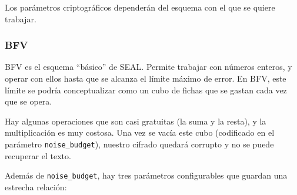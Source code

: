 Los parámetros criptográficos dependerán del esquema con el que se quiere trabajar.

\subsubsection{BFV}

BFV es el esquema ``básico'' de SEAL. Permite trabajar con números enteros, y operar con ellos hasta que se alcanza el límite máximo de error. En BFV, este límite se podría conceptualizar como un cubo de fichas que se gastan cada vez que se opera.

Hay algunas operaciones que son casi gratuitas (la suma y la resta), y la multiplicación es muy costosa. Una vez se vacía este cubo (codificado en el parámetro \verb|noise_budget|), nuestro cifrado quedará corrupto y no se puede recuperar el texto.

Además de \verb|noise_budget|, hay tres parámetros configurables que guardan una estrecha relación:

